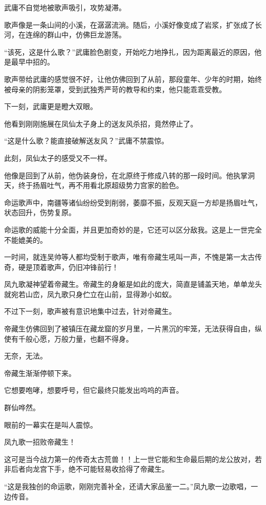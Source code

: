\begin{this_body}
武庸不自觉地被歌声吸引，攻势凝滞。

歌声像是一条山间的小溪，在潺潺流淌。随后，小溪好像变成了岩浆，扩张成了长河，在连绵的群山中，仿佛巨龙游荡。

“该死，这是什么歌？”武庸脸色剧变，开始吃力地挣扎，因为距离最近的原因，他是最早中招的。

歌声带给武庸的感觉很不好，让他仿佛回到了从前，那段童年、少年的时期，始终被母亲的阴影笼罩，受到武独秀严苛的教导和约束，他只能乖乖受教。

下一刻，武庸更是瞪大双眼。

他看到刚刚施展在凤仙太子身上的送友风杀招，竟然停止了。

“这是什么歌？能直接破解送友风？”武庸不禁震惊。

此刻，凤仙太子的感受又不一样。

他像是回到了从前，他伪装身份，在北原终于修成八转的那一段时间。他执掌洞天，终于扬眉吐气，再不用看北原超级势力宫家的脸色。

命运歌声中，南疆等诸仙纷纷受到削弱，萎靡不振，反观天庭一方却是扬眉吐气，状态回升，伤势复原。

命运歌的威能十分全面，并且更加奇妙的是，它还可以区分敌我。这是上一世完全不能媲美的。

一时间，就连吴帅等人都均受制于歌声，唯有帝藏生吼叫一声，不愧是第一太古传奇，硬是顶着歌声，仍旧冲锋前行！

凤九歌凝神望着帝藏生。帝藏生的身躯是如此的庞大，简直是铺盖天地，单单龙头就宛若山峦，凤九歌只身伫立在山前，显得渺小如蚁。

不过下一刻，歌声被有意识地集中过去，针对帝藏生。

帝藏生仿佛回到了被镇压在藏龙窟的岁月里，一片黑沉的牢笼，无法获得自由，纵使有千般心愿，万般力量，也翻不得身。

无奈，无法。

帝藏生渐渐停顿下来。

它想要咆哮，想要呼号，但它最终只能发出呜呜的声音。

群仙哗然。

眼前的一幕实在是叫人震惊。

凤九歌一招败帝藏生！

这可是当今战力第一的传奇太古荒兽！！上一世它能和生命最后期的龙公放对，若非后者向龙宫下手，绝不可能轻易收拾得了帝藏生。

“这是我独创的命运歌，刚刚完善补全，还请大家品鉴一二。”凤九歌一边歌唱，一边传音。


\end{this_body}
